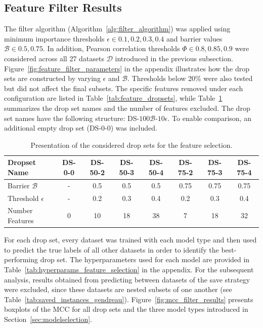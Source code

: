 \subsection{Feature Filter Results}
\label{sec:feature_filter_results}

The filter algorithm (Algorithm~\ref{alg:filter_algorithm}) was applied using minimum importance thresholds $\epsilon \in {0.1, 0.2, 0.3, 0.4}$
and barrier values $\mathcal{B} \in {0.5, 0.75}$. In addition, Pearson correlation thresholds $\Phi \in {0.8, 0.85, 0.9}$ were considered
across all 27 datasets $\mathcal{D}$ introduced in the previous subsection. Figure~\ref{fig:feature_filter_parameters} in the appendix
illustrates how the drop sets are constructed by varying $\epsilon$ and $\mathcal{B}$. Thresholds below 20\% were also tested but
did not affect the final subsets. The specific features removed under each configuration are listed in Table~\ref{tab:feature_dropsets},
while Table~\ref{tab:drop_set_presentation_shortened} summarizes the drop set names and the number of features excluded. The drop set
names have the following structure: DS-$100\mathcal{B}$-$10\epsilon$. To enable
comparison, an additional empty drop set (DS-0-0) was included.

\begin{table}[ht]
    \centering
    \small
    \begin{tabular}{l c c c c c c c}
        \toprule
        Dropset Name          & DS-0-0 & DS-50-2 & DS-50-3 & DS-50-4 & DS-75-2 & DS-75-3 & DS-75-4 \\
        \midrule
        Barrier $\mathcal{B}$ & -      & 0.5     & 0.5     & 0.5     & 0.75    & 0.75    & 0.75    \\
        Threshold $\epsilon$  & -      & 0.2     & 0.3     & 0.4     & 0.2     & 0.3     & 0.4     \\
        Number Features       & 0      & 10      & 18      & 38      & 7       & 18      & 32      \\
        \bottomrule
    \end{tabular}
    \caption{Presentation of the considered drop sets for the feature selection.}
    \label{tab:drop_set_presentation_shortened}
\end{table}
For each drop set, every dataset was trained with each model type and then used to predict the
true labels of all other datasets in order to identify the best-performing drop set. The hyperparameters used for
each model are provided in Table~\ref{tab:hyperparams_feature_selection} in the appendix. For the subsequent analysis,
results obtained from predicting between datasets of the save strategy were excluded, since these datasets are nested
subsets of one another (see Table~\ref{tab:saved_instances_gendreau}). Figure~\ref{fig:mcc_filter_results} presents boxplots of
the \gls{MCC} for all drop sets and the three model types introduced in Section~\ref{sec:modelselection}.

